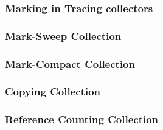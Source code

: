 \documentclass{beamer}
\begin{document}
\begin{frame}
  \frametitle{Marking in Tracing collectors}
  \begin{enumerate}
  \end{enumerate}
\end{frame}

\begin{frame}
  \frametitle{Mark-Sweep Collection}
\end{frame}

\begin{frame}
  \frametitle{Mark-Compact Collection}
\end{frame}

\begin{frame}
  \frametitle{Copying Collection}
\end{frame}

\begin{frame}
  \frametitle{Reference Counting Collection}
\end{frame}
\end{document}
